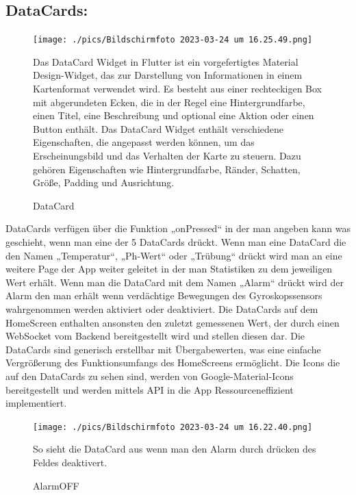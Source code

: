   \subsection*{DataCards:}
  \begin{figure}[h!]
    \begin{minipage}[c]{0.5\textwidth}
      \texttt{[image: ./pics/Bildschirm­foto 2023-03-24 um 16.25.49.png]}
      \caption{DataCard}
    \end{minipage}
    \begin{minipage}[c]{0.5\textwidth}
      \label{fig:DataCard}
      Das DataCard Widget in Flutter ist ein vorgefertigtes Material Design-Widget, das zur Darstellung von Informationen in einem Kartenformat verwendet wird. 
      Es besteht aus einer rechteckigen Box mit abgerundeten Ecken, die in der Regel eine Hintergrundfarbe, einen Titel, eine Beschreibung und optional eine Aktion oder einen Button enthält.
      Das DataCard Widget enthält verschiedene Eigenschaften, die angepasst werden können, um das Erscheinungsbild und das Verhalten der Karte zu steuern. Dazu gehören Eigenschaften wie Hintergrundfarbe, Ränder, Schatten, Größe, Padding und Ausrichtung.  
    \end{minipage}
  \end{figure}
DataCards verfügen über die Funktion „onPressed“ in der man angeben kann was geschieht, wenn man eine der 5 DataCards drückt. Wenn man eine DataCard die den Namen „Temperatur“, „Ph-Wert“ oder „Trübung“ drückt wird man an eine weitere Page der App weiter geleitet in der man Statistiken zu dem jeweiligen Wert erhält. Wenn man die DataCard mit dem Namen „Alarm“ drückt wird der Alarm den man erhält wenn verdächtige Bewegungen des Gyroskopssensors wahrgenommen werden aktiviert oder deaktiviert.
Die DataCards auf dem HomeScreen enthalten ansonsten den zuletzt gemessenen Wert, der durch einen WebSocket vom Backend bereitgestellt wird und stellen diesen dar. Die DataCards sind generisch erstellbar mit Übergabewerten, was eine einfache Vergrößerung des Funktionsumfangs des HomeScreens ermöglicht.
Die Icons die auf den DataCards zu sehen sind, werden von Google-Material-Icons bereitgestellt und werden mittels API in die App Ressourceneffizient implementiert.
\begin{figure}[h!]
    \begin{minipage}[c]{0.5\textwidth}
      \texttt{[image: ./pics/Bildschirm­foto 2023-03-24 um 16.22.40.png]}
      \caption{AlarmOFF}
    \end{minipage}
    \begin{minipage}[c]{0.5\textwidth}
      \label{fig:AlarmOFF}
      So sieht die DataCard aus wenn man den Alarm durch drücken des Feldes deaktivert.
    \end{minipage}
\end{figure}
\newpage
